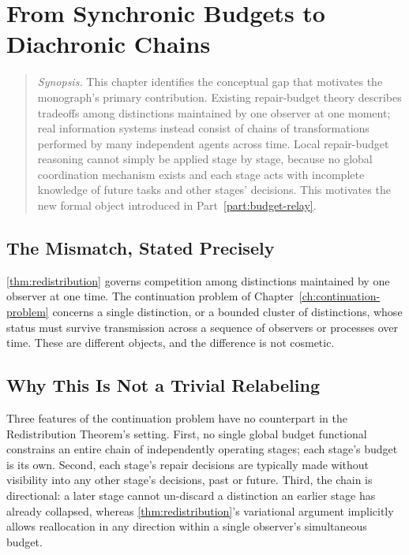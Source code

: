\chapter{From Synchronic Budgets to Diachronic Chains}
\label{ch:synchronic-to-diachronic}

\begin{quotation}
\noindent\textit{Synopsis.} This chapter identifies the conceptual gap that
motivates the monograph's primary contribution. Existing repair-budget
theory describes tradeoffs among distinctions maintained by one observer at
one moment; real information systems instead consist of chains of
transformations performed by many independent agents across time. Local
repair-budget reasoning cannot simply be applied stage by stage, because no
global coordination mechanism exists and each stage acts with incomplete
knowledge of future tasks and other stages' decisions. This motivates the
new formal object introduced in Part~\ref{part:budget-relay}.
\end{quotation}

\section{The Mismatch, Stated Precisely}

\cref{thm:redistribution} governs competition among distinctions
maintained by one observer at one time. The continuation problem of
Chapter~\ref{ch:continuation-problem} concerns a single distinction, or a
bounded cluster of distinctions, whose status must survive transmission
across a sequence of observers or processes over time. These are
different objects, and the difference is not cosmetic.

\section{Why This Is Not a Trivial Relabeling}

Three features of the continuation problem have no counterpart in the
Redistribution Theorem's setting. First, no single global budget
functional constrains an entire chain of independently operating stages;
each stage's budget is its own. Second, each stage's repair decisions are
typically made without visibility into any other stage's decisions, past
or future. Third, the chain is directional: a later stage cannot
un-discard a distinction an earlier stage has already collapsed, whereas
\cref{thm:redistribution}'s variational argument implicitly allows
reallocation in any direction within a single observer's simultaneous
budget.

